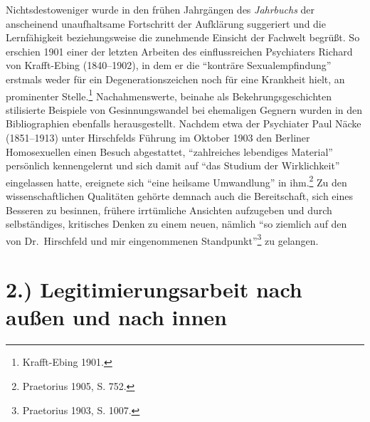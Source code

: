 \documentclass[a4paper,
fontsize=11pt,
oneside,
numbers=noperiodatend,
parskip=half-,
bibliography=totoc,
final
]{scrartcl}
\begin{document}
Nichtsdestoweniger wurde in den frühen Jahrgängen des \emph{Jahrbuchs}
der anscheinend unaufhaltsame Fortschritt der Aufklärung suggeriert und
die Lernfähigkeit beziehungsweise die zunehmende Einsicht der Fachwelt
begrüßt. So erschien 1901 einer der letzten Arbeiten des einflussreichen
Psychiaters Richard von Krafft-Ebing (1840--1902), in dem er die
\enquote{konträre Sexualempfindung} erstmals weder für ein
Degenerationszeichen noch für eine Krankheit hielt, an prominenter
Stelle.\footnote{Krafft-Ebing 1901.} Nachahmenswerte, beinahe als
Bekehrungsgeschichten stilisierte Beispiele von Gesinnungswandel bei
ehemaligen Gegnern wurden in den Bibliographien ebenfalls
herausgestellt. Nachdem etwa der Psychiater Paul Näcke (1851--1913)
unter Hirschfelds Führung im Oktober 1903 den Berliner Homosexuellen
einen Besuch abgestattet, \enquote{zahlreiches lebendiges Material}
persönlich kennengelernt und sich damit auf \enquote{das Studium der
Wirklichkeit} eingelassen hatte, ereignete sich \enquote{eine heilsame
Umwandlung} in ihm.\footnote{Praetorius 1905, S. 752.} Zu den
wissenschaftlichen Qualitäten gehörte demnach auch die Bereitschaft,
sich eines Besseren zu besinnen, frühere irrtümliche Ansichten
aufzugeben und durch selbständiges, kritisches Denken zu einem neuen,
nämlich \enquote{so ziemlich auf den von Dr.~Hirschfeld und mir
eingenommenen Standpunkt}\footnote{Praetorius 1903, S. 1007.} zu
gelangen.

\section*{2.) Legitimierungsarbeit nach außen und nach
innen}\label{legitimierungsarbeit-nach-auuxdfen-und-nach-innen}
\end{document}

